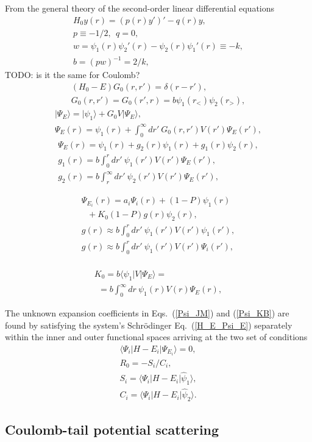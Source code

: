 \documentclass[aip
, pra
, showpacs
, aps
, twocolumn
, groupedaddress
, floatfix
]{revtex4}
\newcommand{\beq}{\begin{equation}}
\newcommand{\eeq}{\end{equation}}
\newcommand{\barr}{\begin{array}}
\newcommand{\earr}{\end{array}}
\begin{document}
From the general theory of the second-order linear differential equations
\beq \barr{l}
H_0 y(r) = (p(r) y')' - q(r) y,\\
p \equiv -1/2, \ \ q = 0,\\
w = \psi_1(r) \psi_2'(r) - \psi_2(r) \psi_1'(r) \equiv -k,\\
b = (pw)^{-1}= 2/k,
\earr \eeq
TODO: is it the same for Coulomb?
\beq \barr{l}
(H_0 - E) G_0(r,r') = \delta(r-r'),\\
G_0(r,r') = G_0(r',r) = b \psi_1(r_{<}) \psi_2(r_{>}),
\earr \eeq
\beq \barr{l}
| \Psi_E \rangle = | \psi_1 \rangle + G_0 V |\Psi_E \rangle,\\
\Psi_E(r) = \psi_1(r) +  \int_0^\infty dr'\ G_0(r,r') V(r') \Psi_E(r'),
\earr \eeq
\beq \barr{l}
\Psi_E(r) = \psi_1(r) +  g_2(r) \psi_1(r) + g_1(r) \psi_2(r),\\
g_1(r) = b \int_0^r dr'\ \psi_1(r') V(r') \Psi_E(r'), \\
g_2(r) = b \int_r^\infty dr'\ \psi_2(r') V(r') \Psi_E(r'),
\earr \eeq

\beq \barr{l}
\Psi_{E_i}(r) = a_i \Psi_i(r)  + (1-P)\psi_1(r)  \\
\ \ \ + K_0 (1-P)g(r)\psi_2(r),\\
g(r) \approx b \int_0^r dr'\ \psi_1(r') V(r') \psi_1(r'), \\
g(r) \approx b \int_0^r dr'\ \psi_1(r') V(r') \Psi_i(r'), \\
\earr \eeq

\beq \barr{l}
K_0 = b \langle \psi_1 | V | \Psi_E \rangle =\\
\ \ = b \int_0^\infty  dr\ \psi_1(r) V(r) \Psi_E(r),
\earr \eeq




The unknown expansion coefficients in Eqs.~(\ref{Psi_JM}) and (\ref{Psi_KB})
are found by satisfying the system's  Schr\"odinger Eq.~(\ref{H_E_Psi_E})
separately within the inner and outer functional spaces
arriving at the two set of conditions
\beq \barr{l}
\langle\Psi_i|H-E_i|\Psi_{E_i}\rangle=0,\\
R_0 = - S_i / C_i, \\
S_i = \langle\Psi_i|H-E_i|  \hat{\psi}_1 \rangle, \\
C_i = \langle\Psi_i|H-E_i|  \hat{\psi}_2 \rangle.
\earr \eeq






\subsection{Coulomb-tail potential scattering}
\end{document}
